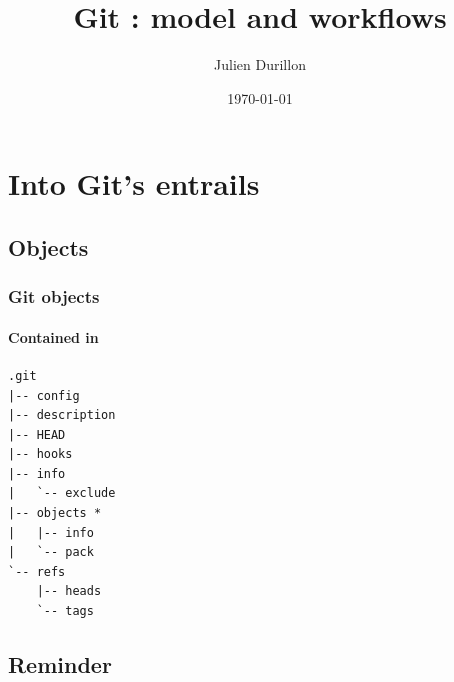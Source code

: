 \documentclass{beamer}
\title{Git : model and workflows}
\author{Julien Durillon}
\date{\today}
\begin{document}
	\frame{\titlepage}


	\section{Into Git's entrails}

	\subsection{Objects}

    \begin{frame}[fragile]
	    \frametitle{Git objects}
	    \framesubtitle{Contained in}
        \begin{verbatim}
.git
|-- config
|-- description
|-- HEAD
|-- hooks
|-- info
|   `-- exclude
|-- objects *
|   |-- info
|   `-- pack
`-- refs
    |-- heads
    `-- tags
        \end{verbatim}
	\end{frame}


	\subsection{Reminder}
\end{document}
